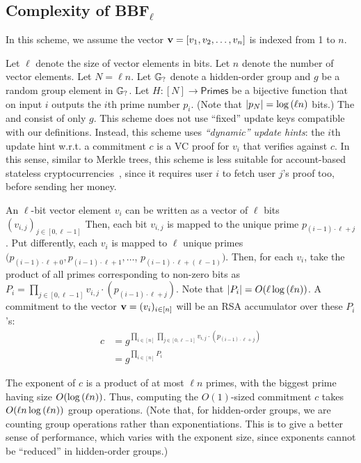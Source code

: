 \subsection{Complexity of BBF$_\ell$~\cite{BBF19}}
\label{s:complexity-bbf}
In this scheme, we assume the vector $\bm{\mathrm{v}}=[v_1, v_2, \dots, v_n]$ is indexed from 1 to $n$.

Let $\ell$ denote the size of vector elements in bits.
Let $n$ denote the number of vector elements.
Let $N=\ell n$.
Let $\mathbb{G}_{?}$ denote a hidden-order group and $g$ be a random group element in $\mathbb{G}_{?}$.
Let $H : [N] \rightarrow \mathsf{Primes}$ be a bijective function that on input $i$ outputs the $i$th prime number $p_i$.
(Note that $|p_N|=\log{(\ell n)}$ bits.)
The \prk and \vrk consist of only $g$.
This scheme does not use ``fixed'' update keys compatible with our definitions.
Instead, this scheme uses \textit{``dynamic'' update hints}: the $i$th update hint w.r.t. a commitment $c$ is a VC proof for $v_i$ that verifies against $c$.
In this sense, similar to Merkle trees, this scheme is less suitable for account-based stateless cryptocurrencies~\cite{CPZ18}, since it requires user $i$ to fetch user $j$'s proof too, before sending her money.

An $\ell$-bit vector element $v_i$ can be written as a vector of $\ell$ bits $(v_{i,j})_{j\in [0,\ell-1]}$
Then, each bit $v_{i,j}$ is mapped to the unique prime $p_{(i-1)\cdot \ell + j}$.
Put differently, each $v_i$ is mapped to $\ell$ unique primes $(p_{(i-1)\cdot \ell + 0}, p_{(i-1)\cdot \ell + 1},\dots$, $p_{(i-1)\cdot \ell+ (\ell - 1)})$.
Then, for each $v_i$, take the product of all primes corresponding to non-zero bits as $P_i = \prod_{j\in[0,\ell-1]} {v_{i,j}}\cdot \left(p_{(i-1)\cdot \ell + j}\right)$.
Note that $|P_i| = O(\ell \log{(\ell n)})$.
A commitment to the vector $\bm{\mathrm{v}}=(v_i)_{i\in [n]}$ will be an RSA accumulator over these $P_i$'s:
\begin{align}
c
  &=g^{\prod_{i\in [n]}\prod_{j\in[0,\ell-1]} v_{i,j}\cdot \left( p_{(i-1)\cdot \ell + j} \right)}\\
  &=g^{\prod_{i\in [n]} P_i}
\end{align}

The exponent of $c$ is a product of at most $\ell n$ primes, with the biggest prime having size $O(\log{(\ell n)})$.
Thus, computing the $O(1)$-sized commitment $c$ takes $O(\ell n \log{(\ell n)})$ group operations.
(Note that, for hidden-order groups, we are counting group operations rather than exponentiations.
This is to give a better sense of performance, which varies with the exponent size, since exponents cannot be ``reduced'' in hidden-order groups.)

